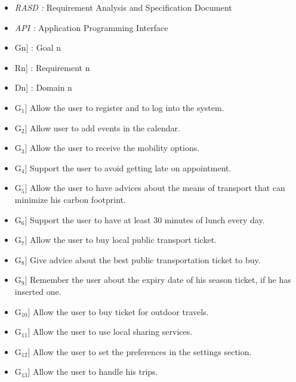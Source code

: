 \begin{itemize}
	\setlength{\leftskip}{0.5cm}
	\item \emph{RASD : }Requirement Analysis and Specification Document
	\item \emph{API : }Application Programming Interface
\end{itemize}

\begin{itemize}
	\setlength{\leftskip}{0.5cm}
	\item \lbrack Gn] : Goal n
	\item \lbrack Rn] : Requirement n
	\item \lbrack Dn] : Domain n
\end{itemize}

\begin{itemize}
	\setlength{\leftskip}{0.5cm}
	\item \lbrack G$_{1}$] Allow the user to register and to log into the system.
	\item \lbrack G$_{2}$] Allow user to add events in the calendar.
	\item \lbrack G$_{3}$] Allow the user to receive the mobility options.
	\item \lbrack G$_{4}$] Support the user to avoid getting late on appointment.
	\item \lbrack G$_{5}$] Allow the user to have advices about the means of transport that can minimize his carbon footprint.
	\item \lbrack G$_{6}$] Support the user to have at least 30 minutes of lunch every day.
	\item \lbrack G$_{7}$] Allow the user to buy local public transport ticket.
	\item \lbrack G$_{8}$] Give advice about the best public transportation ticket to buy.
	\item \lbrack G$_{9}$] Remember the user about the expiry date of his season ticket, if he has inserted one.
	\item \lbrack G$_{10}$] Allow the user to buy ticket for outdoor travels.
	\item \lbrack G$_{11}$] Allow the user to use local sharing services.
	\item \lbrack G$_{12}$] Allow the user to set the preferences in the settings section.
	\item \lbrack G$_{13}$] Allow the user to handle his trips.
\end{itemize}

